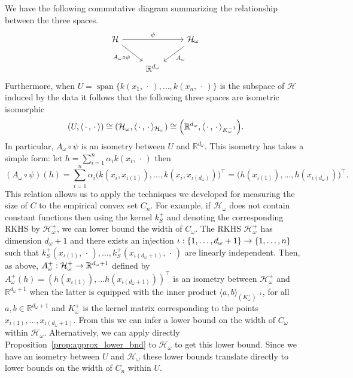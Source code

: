 \documentclass[AHL,Unicode,longabstracts,published]{cedram}
\theoremstyle{remark}
\DeclareMathOperator{\spn}{span}
\newcommand{\R}{\mathbb{R}}
\newcommand{\cH}{\mathcal{H}}
\renewcommand*{\to}{\mathchoice{\longrightarrow}{\rightarrow}{\rightarrow}{\rightarrow}}
\let\originalleft\left
\let\originalright\right
\renewcommand{\left}{\mathopen{}\mathclose\bgroup\originalleft}
\renewcommand{\right}{\aftergroup\egroup\originalright}
\begin{document}
We have the following commutative diagram summarizing the relationship between the three spaces.
\begin{equation*}
\begin{tikzcd}
\cH \arrow{rr}{\psi} \arrow[swap]{dr}{A_\omega \circ \psi} & & \cH_\omega \arrow{dl}{A_\omega} \\
& \R^{d_\omega}
\end{tikzcd}
\end{equation*}
Furthermore, when $U = \spn\{k(x_1,\,\cdot\,), \dots, k(x_n,\,\cdot\,) \}$ is the subspace of $\cH$ induced by the data it follows that the following three spaces are isometric isomorphic
\[
(U,\langle \,\cdot\,,\,\cdot\, \rangle) \cong (\cH_\omega, \langle \,\cdot\,, \,\cdot\, \rangle_{\cH_\omega}) \cong \left(\R^{d_\omega},\langle \,\cdot\,, \,\cdot\, \rangle_{K_\omega^{-1}}\right).
\]
In particular, $A_\omega \circ \psi$ is an isometry between $U$ and $\R^{d_\omega}$. This isometry has takes a simple form: let $h = \sum_{i=1}^n \alpha_i k(x_i,\,\cdot\,)$ then
\[
(A_\omega \circ \psi)(h) = \sum_{i=1}^n \alpha_i \bigl(k(x_i,x_{\iota(1)}),\dots, k(x_i,x_{\iota(d_\omega)})\bigr)^\top = \bigl(h(x_{\iota(1)}),\dots, h(x_{\iota(d_\omega)})\bigr)^\top.
\]
This relation allows us to apply the techniques we developed for measuring the size of $C$ to the empirical convex set $C_n$. For example, if $\cH_\omega$ does not contain constant functions then using the kernel $k_S^+$ and denoting the corresponding RKHS by $\cH_\omega^+$, we can lower bound the width of $C_\omega$. The RKHS $\cH_\omega^+$ has dimension $d_\omega +1$ and there exists an injection $\iota: \{1,\dots, d_\omega+1 \} \to \{1,\dots,n\}$ such that $k_S^+(x_{\iota(1)},\,\cdot\,), \dots, k_S^+(x_{\iota(d_\omega+1)},\,\cdot\,)$ are linearly independent. Then, as above, $A_\omega^+: \cH_\omega^+ \to \R^{d_\omega +1}$ defined by $A_\omega^+(h) = (h(x_{\iota(1)}),\dots h(x_{\iota(d_\omega+1)}))^\top$ is an isometry between $\cH_\omega^+$ and $\R^{d_\omega+1}$ when the latter is equipped with the inner product $\langle a,b \rangle_{(K_\omega^+)^{-1}}$, for all $a,b \in \R^{d_\omega+1}$ and $K_\omega^+$ is the kernel matrix corresponding to the points $x_{\iota(1)},\dots, x_{\iota(d_\omega+1)}$. From this we can infer a lower bound on the width of $C_\omega$ within $\cH_\omega$. Alternatively, we can apply directly Proposition~\ref{prop:approx_lower_bnd} to $\cH_\omega$ to get this lower bound. Since we have an isometry between $U$ and $\cH_\omega$ these lower bounds translate directly to lower bounds on the width of $C_n$ within $U$.
\end{document}
